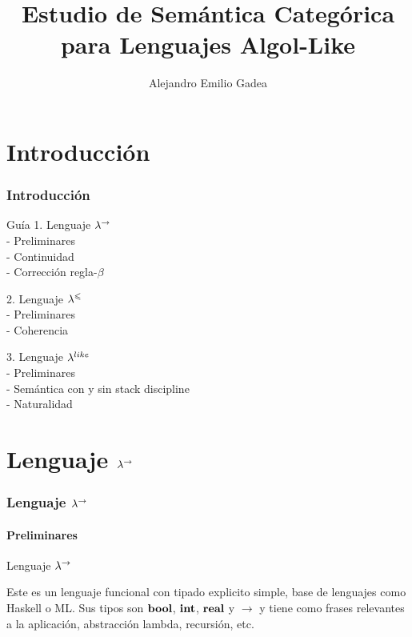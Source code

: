 \documentclass{beamer}
\begin{document}
\beamertemplatenavigationsymbolsempty
\title{Estudio de Semántica Categórica para Lenguajes Algol-Like}
\author{{Alejandro Emilio Gadea}\\
\vspace*{0.5cm}}
\date{}
\frame{\titlepage}

\section{Introducci\'on}

\begin{frame}
\frametitle{Introducci\'on}
\begin{block}{Gu\'ia}
1. Lenguaje $\lambda^{\rightarrow}$\\
\quad \quad - Preliminares \\
\quad \quad - Continuidad \\
\quad \quad - Corrección regla-$\beta$\\

\pause

2. Lenguaje $\lambda^{\leqslant}$\\
\quad \quad - Preliminares \\
\quad \quad - Coherencia \\

\pause

3. Lenguaje $\lambda^{like}$\\
\quad \quad - Preliminares \\
\quad \quad - Semántica con y sin stack discipline \\
\quad \quad - Naturalidad 

\end{block}
\end{frame}

\section{Lenguaje $\lambda^{\rightarrow}$}

\begin{frame}
\frametitle{Lenguaje $\lambda^{\rightarrow}$}
\framesubtitle{Preliminares}

\begin{block}{Lenguaje $\lambda^{\rightarrow}$}

Este es un lenguaje funcional con tipado explicito simple, base
de lenguajes como Haskell o ML. Sus tipos son $\textbf{bool}$, $\textbf{int}$, $\textbf{real}$ y $\rightarrow$
y tiene como frases relevantes a la aplicación, abstracción lambda, recursión, etc.

\end{block}

\end{frame}
\end{document}
